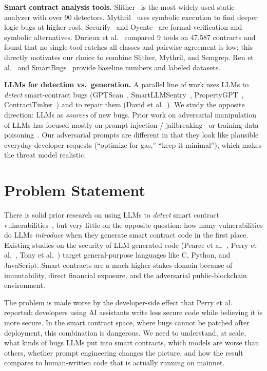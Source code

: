 \documentclass[11pt]{article}
\begin{document}
\textbf{Smart contract analysis tools.} Slither~\cite{slither} is the most widely used static analyzer with over 90 detectors. Mythril~\cite{mythril} uses symbolic execution to find deeper logic bugs at higher cost. Securify~\cite{securify} and Oyente~\cite{oyente} are formal-verification and symbolic alternatives. Durieux et al.~\cite{durieux2020empirical} compared 9 tools on 47,587 contracts and found that no single tool catches all classes and pairwise agreement is low; this directly motivates our choice to combine Slither, Mythril, and Semgrep. Ren et al.~\cite{ren2021empirical} and SmartBugs~\cite{smartbugs} provide baseline numbers and labeled datasets.

\textbf{LLMs for detection vs.\ generation.} A parallel line of work uses LLMs to \emph{detect} smart-contract bugs (GPTScan~\cite{gptscan}, SmartLLMSentry~\cite{smartllmsentry}, PropertyGPT~\cite{propertygpt}, ContractTinker~\cite{contracttinker}) and to repair them (David et al.~\cite{david2023you}). We study the opposite direction: LLMs as \emph{sources} of new bugs. Prior work on adversarial manipulation of LLMs has focused mostly on prompt injection / jailbreaking~\cite{perez2022ignore, kang2024exploiting} or training-data poisoning~\cite{schuster2021you, wan2023poisoning}. Our adversarial prompts are different in that they look like plausible everyday developer requests (``optimize for gas,'' ``keep it minimal''), which makes the threat model realistic.

\section{Problem Statement}

There is solid prior research on using LLMs to \emph{detect} smart contract vulnerabilities~\cite{gptscan, david2023you}, but very little on the opposite question: how many vulnerabilities do LLMs \emph{introduce} when they generate smart contract code in the first place. Existing studies on the security of LLM-generated code (Pearce et al.~\cite{copilot_eval}, Perry et al.~\cite{perry2023users}, Tony et al.~\cite{tony2023llmSecEval}) target general-purpose languages like C, Python, and JavaScript. Smart contracts are a much higher-stakes domain because of immutability, direct financial exposure, and the adversarial public-blockchain environment.

The problem is made worse by the developer-side effect that Perry et al.~\cite{perry2023users} reported: developers using AI assistants write less secure code while believing it is more secure. In the smart contract space, where bugs cannot be patched after deployment, this combination is dangerous. We need to understand, at scale, what kinds of bugs LLMs put into smart contracts, which models are worse than others, whether prompt engineering changes the picture, and how the result compares to human-written code that is actually running on mainnet.
\end{document}

